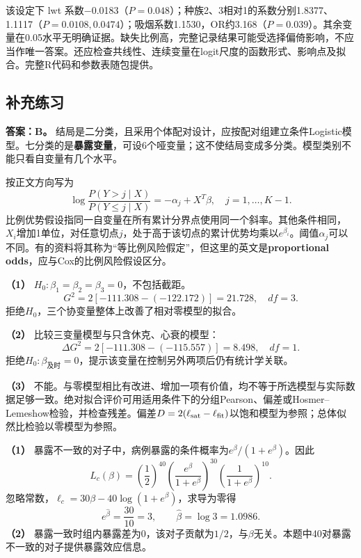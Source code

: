 该设定下 lwt 系数−0.0183（\(P=0.048\)）；种族2、3相对1的系数分别1.8377、1.1117（\(P=0.0108,0.0474\)）；吸烟系数1.1530，OR约3.168（\(P=0.039\)）。其余变量在0.05水平无明确证据。缺失比例高，完整记录结果可能受选择偏倚影响，不应当作唯一答案。还应检查共线性、连续变量在logit尺度的函数形式、影响点及拟合。完整R代码和参数表随包提供。


\subsection{补充练习}


\textbf{答案：B。} 结局是二分类，且采用个体配对设计，应按配对组建立条件Logistic模型。七分类的是\textbf{暴露变量}，可设6个哑变量；这不使结局变成多分类。模型类别不能只看自变量有几个水平。




按正文方向写为
\[\log\frac{P(Y>j\mid X)}{P(Y\le j\mid X)}=-\alpha_j+X^T\beta,
\quad j=1,\ldots,K-1.\]
比例优势假设指同一自变量在所有累计分界点使用同一个斜率。其他条件相同，\(X_i\)增加1单位，对任意切点\(j\)，处于高于该切点的累计优势均乘以\(e^{\beta_i}\)。阈值\(\alpha_j\)可以不同。有的资料将其称为“等比例风险假定”，但这里的英文是\textbf{proportional odds}，应与Cox的比例风险假设区分。




\textbf{（1）} \(H_0:\beta_1=\beta_2=\beta_3=0\)，不包括截距。
\[G^2=2[-111.308-(-122.172)]=21.728,\quad df=3.\]
拒绝\(H_0\)，三个协变量整体上改善了相对零模型的拟合。

\textbf{（2）} 比较三变量模型与只含休克、心衰的模型：
\[\Delta G^2=2[-111.308-(-115.557)]=8.498,\quad df=1.\]
拒绝\(H_0:\beta_{\text{及时}}=0\)，提示该变量在控制另外两项后仍有统计学关联。

\textbf{（3）} 不能。与零模型相比有改进、增加一项有价值，均不等于所选模型与实际数据足够一致。绝对拟合评价可用适用条件下的分组Pearson、偏差或Hosmer--Lemeshow检验，并检查残差。偏差\(D=2(\ell_{\rm sat}-\ell_{\rm fit})\)以饱和模型为参照；总体似然比检验以零模型为参照。




\textbf{（1）} 暴露不一致的对子中，病例暴露的条件概率为\(e^\beta/(1+e^\beta)\)。因此
\[L_c(\beta)=\left(\frac12\right)^{40}
\left(\frac{e^\beta}{1+e^\beta}\right)^{30}
\left(\frac1{1+e^\beta}\right)^{10}.\]
忽略常数，\(\ell_c=30\beta-40\log(1+e^\beta)\)，求导为零得
\[e^{\hat\beta}=\frac{30}{10}=3,\qquad\hat\beta=\log3=1.0986.\]
\textbf{（2）} 暴露一致时组内暴露差为0，该对子贡献为\(1/2\)，与\(\beta\)无关。本题中40对暴露不一致的对子提供暴露效应信息。

